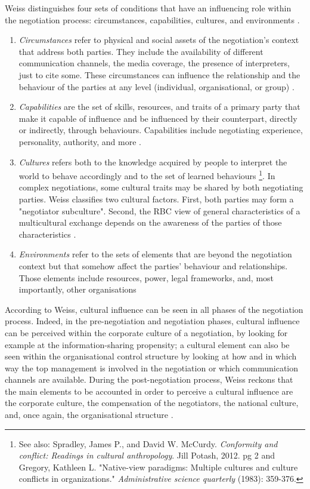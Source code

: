 \documentclass[../main.tex]{subfiles}
\begin{document}
Weiss distinguishes four sets of conditions that have an influencing role within the negotiation process: circumstances, capabilities, cultures, and environments \autocite[287]{weiss}.
\begin{enumerate}
    \item \textit{Circumstances} refer to physical and social assets of the negotiation's context that address both parties. They include the availability of different communication channels, the media coverage, the presence of interpreters, just to cite some. These circumstances can influence the relationship and the behaviour of the parties at any level (individual, organisational, or group) \autocite[287]{weiss}.
    \item \textit{Capabilities} are the set of skills, resources, and traits of a primary party that make it capable of influence and be influenced by their counterpart, directly or indirectly, through behaviours. Capabilities include negotiating experience, personality, authority, and more \autocite[288]{weiss}.
    \item \textit{Cultures} refers both to the knowledge acquired by people to interpret the world to behave accordingly and to the set of learned behaviours \autocite[288]{weiss}\footnote{See also: Spradley, James P., and David W. McCurdy. \textit{Conformity and conflict: Readings in cultural anthropology}. Jill Potash, 2012. pg 2  and\\
    Gregory, Kathleen L. "Native-view paradigms: Multiple cultures and culture conflicts in organizations." \textit{Administrative science quarterly} (1983): 359-376.}.
    In complex negotiations, some cultural traits may be shared by both negotiating parties. Weiss classifies two cultural factors. First, both parties may form a "negotiator subculture". Second, the RBC view of general characteristics of a multicultural exchange depends on the awareness of the parties of those characteristics \mancite\autocite[289]{weiss}.
   \item \textit{Environments} refer to the sets of elements that are beyond the negotiation context but that somehow affect the parties' behaviour and relationships. Those elements include resources, power, legal frameworks, and, most importantly, other organisations 
\end{enumerate}

According to Weiss, cultural influence can be seen in all phases of the negotiation process. Indeed, in the pre-negotiation and negotiation phases, cultural influence can be perceived within the corporate culture of a negotiation, by looking for example at the information-sharing propensity; a cultural element can also be seen within the organisational control structure by looking at how and in which way the top management is involved in the negotiation or which communication channels are available. During the post-negotiation process, Weiss reckons that the main elements to be accounted in order to perceive a cultural influence are the corporate culture, the compensation of the negotiators, the national culture, and, once again, the organisational structure \autocite[285]{weiss}.
\end{document}

